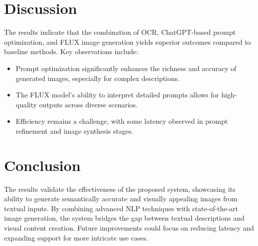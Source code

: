 \section{Discussion}
The results indicate that the combination of OCR, ChatGPT-based prompt optimization, and FLUX image generation yields superior outcomes compared to baseline methods. Key observations include:
\begin{itemize}
    \item Prompt optimization significantly enhances the richness and accuracy of generated images, especially for complex descriptions.
    \item The FLUX model’s ability to interpret detailed prompts allows for high-quality outputs across diverse scenarios.
    \item Efficiency remains a challenge, with some latency observed in prompt refinement and image synthesis stages.
\end{itemize}



\section{Conclusion}
The results validate the effectiveness of the proposed system, showcasing its ability to generate semantically accurate and visually appealing images from textual inputs. By combining advanced NLP techniques with state-of-the-art image generation, the system bridges the gap between textual descriptions and visual content creation. Future improvements could focus on reducing latency and expanding support for more intricate use cases.